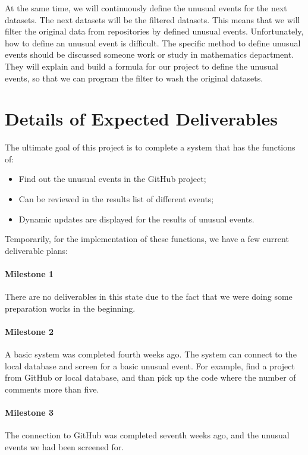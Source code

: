 \documentclass[conference]{IEEEtran}
\begin{document}
At the same time, we will continuously define the unusual events for the next datasets. The next datasets will be the filtered datasets. This means that we will filter the original data from repositories by defined unusual events. Unfortunately, how to define an unusual event is difficult. The specific method to define unusual events should be discussed someone work or study in mathematics department. They will explain and build a formula for our project to define the unusual events, so that we can program the filter to wash the original datasets.


\section{Details of Expected Deliverables}

The ultimate goal of this project is to complete a system that has the functions of:
\bigskip
\begin{itemize}
\item Find out the unusual events in the GitHub project;

\item Can be reviewed in the results list of different events;
\item Dynamic updates are displayed for the results of unusual events.
\end{itemize}
\bigskip
Temporarily, for the implementation of these functions, we have a few current deliverable plans:\\

\paragraph{\textbf{Milestone 1}}
There are no deliverables in this state due to the fact that we were doing some preparation works in the beginning.\\

\paragraph{\textbf{Milestone 2}}
A basic system was completed fourth weeks ago. The system can connect to the local database and screen for a basic unusual event. For example, find a project from GitHub or local database, and than pick up the code where the number of comments more than five.\\

\paragraph{\textbf{Milestone 3}}
The connection to GitHub was completed seventh weeks ago, and the unusual events we had been screened for.\\
\end{document}
